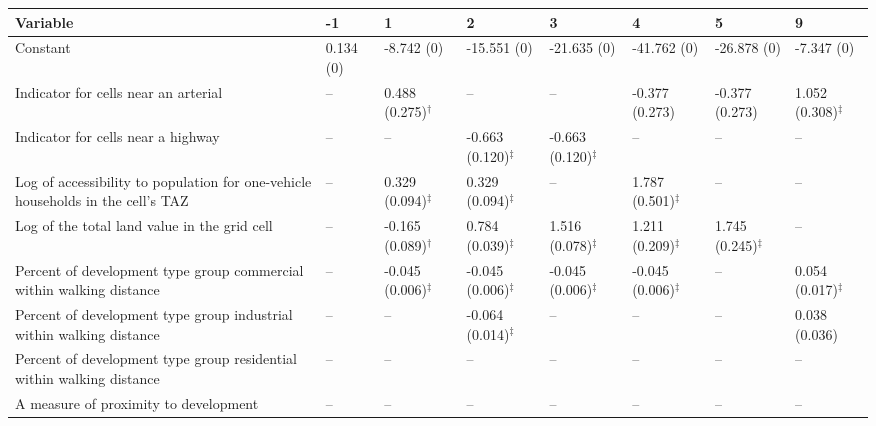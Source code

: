 
\begin{tabular}{p{3in}p{0.5in}p{0.5in}p{0.5in}p{0.5in}p{0.5in}p{0.5in}p{0.5in}}
\hline\hline
Variable & -1 & 1 & 2 & 3 & 4 & 5 & 9 \\\hline
Constant & 0.134 (0) & -8.742 (0) & -15.551 (0) & -21.635 (0) & -41.762 (0) & -26.878 (0) & -7.347 (0) \\
Indicator for cells near an arterial & -- & 0.488 (0.275)$^{\dagger}$ & -- & -- & -0.377 (0.273) & -0.377 (0.273) & 1.052 (0.308)$^{\ddagger}$ \\
Indicator for cells near a highway & -- & -- & -0.663 (0.120)$^{\ddagger}$ & -0.663 (0.120)$^{\ddagger}$ & -- & -- & -- \\
Log of accessibility to population for one-vehicle households in the cell's TAZ & -- & 0.329 (0.094)$^{\ddagger}$ & 0.329 (0.094)$^{\ddagger}$ & -- & 1.787 (0.501)$^{\ddagger}$ & -- & -- \\
Log of the total land value in the grid cell & -- & -0.165 (0.089)$^{\dagger}$ & 0.784 (0.039)$^{\ddagger}$ & 1.516 (0.078)$^{\ddagger}$ & 1.211 (0.209)$^{\ddagger}$ & 1.745 (0.245)$^{\ddagger}$ & -- \\
Percent of development type group commercial within walking distance & -- & -0.045 (0.006)$^{\ddagger}$ & -0.045 (0.006)$^{\ddagger}$ & -0.045 (0.006)$^{\ddagger}$ & -0.045 (0.006)$^{\ddagger}$ & -- & 0.054 (0.017)$^{\ddagger}$ \\
Percent of development type group industrial within walking distance & -- & -- & -0.064 (0.014)$^{\ddagger}$ & -- & -- & -- & 0.038 (0.036) \\
Percent of development type group residential within walking distance & -- & -- & -- & -- & -- & -- & -- \\
A measure of proximity to development & -- & -- & -- & -- & -- & -- & -- \\
\hline\hline
\end{tabular}
